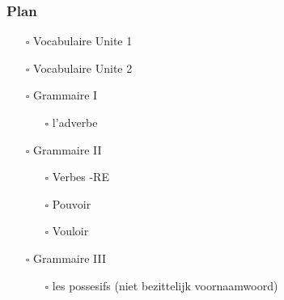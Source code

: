 \documentclass[11pt]{article}
\begin{document}
\subsubsection{Plan}
\label{sec:org7603f1e}
\begin{itemize}
\item[{$\square$}] Vocabulaire Unite 1
\item[{$\square$}] Vocabulaire Unite 2
\item[{$\square$}] Grammaire I
\begin{itemize}
\item[{$\square$}] l'adverbe
\end{itemize}
\item[{$\square$}] Grammaire II
\begin{itemize}
\item[{$\square$}] Verbes -RE
\item[{$\square$}] Pouvoir
\item[{$\square$}] Vouloir
\end{itemize}
\item[{$\square$}] Grammaire III
\begin{itemize}
\item[{$\square$}] les possesifs (niet bezittelijk voornaamwoord)
\end{itemize}
\end{itemize}
\end{document}
